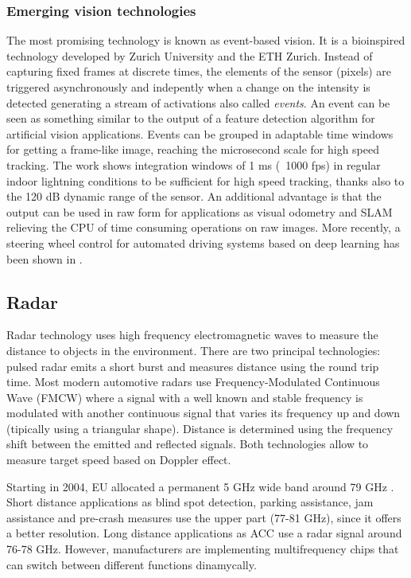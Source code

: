\subsubsection{Emerging vision technologies}

The most promising technology is known as event-based vision. It is a 
bioinspired technology developed by Zurich University and the ETH Zurich. 
Instead of capturing fixed frames at discrete times, the elements of the sensor
(pixels) are triggered asynchronously and indepently when a change on the
intensity is detected generating a stream of activations also called 
\emph{events}. 
An event can be seen as something similar to the output of a feature detection 
algorithm for artificial vision applications.
Events can be grouped in adaptable time windows for getting a frame-like image,
reaching the microsecond scale for high speed tracking. 
The work \cite{Mueggler2014} shows integration windows of 1 ms (~1000 fps) in
regular indoor lightning conditions to be sufficient for high speed tracking, 
thanks also to the 120 dB dynamic range of the sensor.
An additional advantage is that the output can be used in raw form for 
applications as visual odometry \cite{Censi2014} and SLAM \cite{Vidal2017}
relieving the CPU of time consuming operations on raw images.
More recently, a steering wheel control for automated driving systems 
based on deep learning has been shown in \cite{Maqueda2018}.
 
 

\subsection{Radar}

Radar technology uses high frequency electromagnetic waves to measure the
distance to objects in the environment.
There are two principal technologies: pulsed radar emits a short burst and 
measures distance using the round trip time. Most modern automotive 
radars use Frequency-Modulated Continuous Wave (FMCW) where a signal with
a well known and stable frequency is modulated with another continuous signal
that varies its frequency up and down (tipically using a triangular shape).
Distance is determined using the frequency shift between the emitted and 
reflected signals. Both technologies allow to measure target speed based
on Doppler effect.

Starting in 2004, EU allocated a permanent 5 GHz wide band around 79 GHz 
\cite{EULawandPublications2004}. 
Short distance applications as blind spot detection, parking assistance, jam 
assistance and pre-crash measures use the upper part (77-81 GHz), since it 
offers a better resolution. Long distance applications as ACC use a radar 
signal around 76-78 GHz. However, manufacturers are implementing multifrequency 
chips that can switch between different functions dinamycally.

